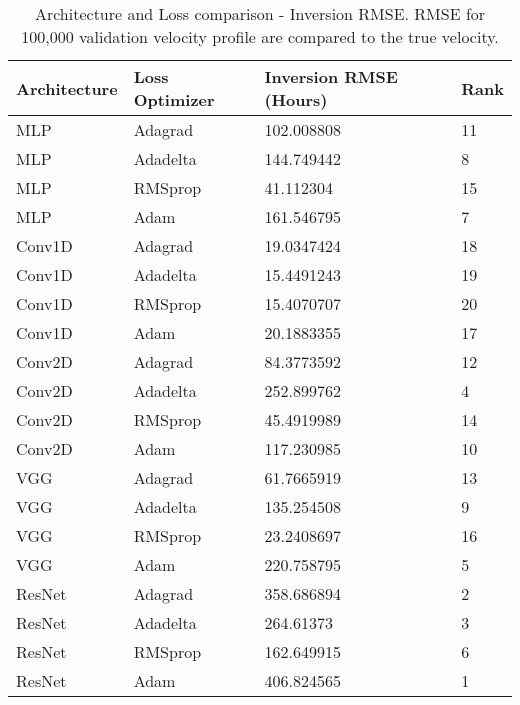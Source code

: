 \begin{table*}[!ht]
    \footnotesize
    \centering
    \begin{tabular}{@{}llll@{}}\toprule
            Architecture & Loss Optimizer & Inversion RMSE (Hours) & Rank         \\ \hline
                MLP          & Adagrad        & 102.008808 & 11   \\
                MLP          & Adadelta       & 144.749442 & 8    \\
                MLP          & RMSprop        & 41.112304  & 15   \\
                MLP          & Adam           & 161.546795 & 7    \\
                Conv1D       & Adagrad        & 19.0347424 & 18   \\
                Conv1D       & Adadelta       & 15.4491243 & 19   \\
                Conv1D       & RMSprop        & 15.4070707 & 20   \\
                Conv1D       & Adam           & 20.1883355 & 17   \\
                Conv2D       & Adagrad        & 84.3773592 & 12   \\
                Conv2D       & Adadelta       & 252.899762 & 4    \\
                Conv2D       & RMSprop        & 45.4919989 & 14   \\
                Conv2D       & Adam           & 117.230985 & 10   \\
                VGG          & Adagrad        & 61.7665919 & 13   \\
                VGG          & Adadelta       & 135.254508 & 9    \\
                VGG          & RMSprop        & 23.2408697 & 16   \\
                VGG          & Adam           & 220.758795 & 5    \\
                ResNet       & Adagrad        & 358.686894 & 2    \\
                ResNet       & Adadelta       & 264.61373  & 3    \\
                ResNet       & RMSprop        & 162.649915 & 6    \\
                ResNet       & Adam           & 406.824565 & 1   \\            
             \hline
    \end{tabular}
    \caption[Architecture and Loss comparison - Inversion RMSE]{Architecture and Loss comparison - Inversion RMSE. RMSE for 100,000 validation velocity profile are compared to the true velocity.}\label{tab:app_res1_inversion}
\end{table*}

